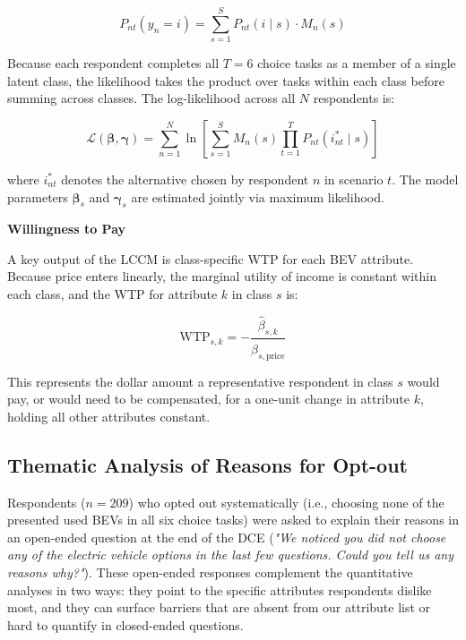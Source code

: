 \documentclass[a4paper,fleqn]{cas-sc}   %
\begin{document}
\begin{equation}
    P_{nt}(y_n = i) = \sum_{s=1}^{S} P_{nt}(i \mid s) \cdot M_n(s)
    \label{eq:unconditional}
\end{equation}

Because each respondent completes all $T = 6$ choice tasks as a member of a single latent class, the likelihood takes the product over tasks within each class before summing across classes. The log-likelihood across all $N$ respondents is:

\begin{equation}
    \mathcal{L}(\boldsymbol{\beta}, \boldsymbol{\gamma}) = \sum_{n=1}^{N} \ln \left[ \sum_{s=1}^{S} M_n(s) \prod_{t=1}^{T} P_{nt}(i_{nt}^* \mid s) \right]
    \label{eq:loglik}
\end{equation}

\noindent where $i_{nt}^*$ denotes the alternative chosen by respondent $n$ in scenario $t$. The model parameters $\boldsymbol{\beta}_s$ and $\boldsymbol{\gamma}_s$ are estimated jointly via maximum likelihood.

\vspace{\baselineskip}
\noindent \textbf{Willingness to Pay} \par

A key output of the LCCM is class-specific WTP for each BEV attribute. Because price enters linearly, the marginal utility of income is constant within each class, and the WTP for attribute $k$ in class $s$ is:

\begin{equation}
    \text{WTP}_{s,k} = -\frac{\hat{\beta}_{s,k}}{\hat{\beta}_{s,\text{price}}}
    \label{eq:wtp}
\end{equation}

\noindent This represents the dollar amount a representative respondent in class $s$ would pay, or would need to be compensated, for a one-unit change in attribute $k$, holding all other attributes constant.

\subsection{Thematic Analysis of Reasons for Opt-out}
Respondents ($n=209$) who opted out systematically (i.e., choosing none of the presented used BEVs in all six choice tasks) were asked to explain their reasons in an open-ended question at the end of the DCE (\textit{"We noticed you did not choose any of the electric vehicle options in the last few questions. Could you tell us any reasons why?"}). These open-ended responses complement the quantitative analyses in two ways: they point to the specific attributes respondents dislike most, and they can surface barriers that are absent from our attribute list or hard to quantify in closed-ended questions. 
\end{document}

